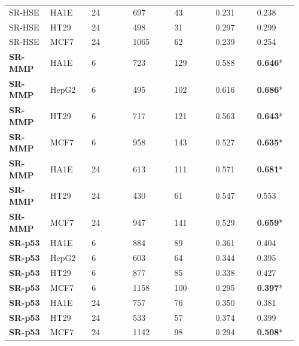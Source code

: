 \begin{longtable}{p{0.137\linewidth}p{0.137\linewidth}p{0.137\linewidth}p{0.137\linewidth}p{0.137\linewidth}p{0.137\linewidth}p{0.137\linewidth}}
SR-HSE & HA1E & 24 & 697 & 43 & 0.231 & 0.238 \\
SR-HSE & HT29 & 24 & 498 & 31 & 0.297 & 0.299 \\
SR-HSE & MCF7 & 24 & 1065 & 62 & 0.239 & 0.254 \\
\textbf{SR-MMP} & HA1E & 6 & 723 & 129 & 0.588 & \textbf{0.646}* \\
\textbf{SR-MMP} & HepG2 & 6 & 495 & 102 & 0.616 & \textbf{0.686}* \\
\textbf{SR-MMP} & HT29 & 6 & 717 & 121 & 0.563 & \textbf{0.643}* \\
\textbf{SR-MMP} & MCF7 & 6 & 958 & 143 & 0.527 & \textbf{0.635}* \\
\textbf{SR-MMP} & HA1E & 24 & 613 & 111 & 0.571 & \textbf{0.681}* \\
\textbf{SR-MMP} & HT29 & 24 & 430 & 61 & 0.547 & 0.553 \\
\textbf{SR-MMP} & MCF7 & 24 & 947 & 141 & 0.529 & \textbf{0.659}* \\
\textbf{SR-p53} & HA1E & 6 & 884 & 89 & 0.361 & 0.404 \\
\textbf{SR-p53} & HepG2 & 6 & 603 & 64 & 0.344 & 0.395 \\
\textbf{SR-p53} & HT29 & 6 & 877 & 85 & 0.338 & 0.427 \\
\textbf{SR-p53} & MCF7 & 6 & 1158 & 100 & 0.295 & \textbf{0.397}* \\
\textbf{SR-p53} & HA1E & 24 & 757 & 76 & 0.350 & 0.381 \\
\textbf{SR-p53} & HT29 & 24 & 533 & 57 & 0.374 & 0.399 \\
\textbf{SR-p53} & MCF7 & 24 & 1142 & 98 & 0.294 & \textbf{0.508}* \\
\bottomrule
\end{longtable}

